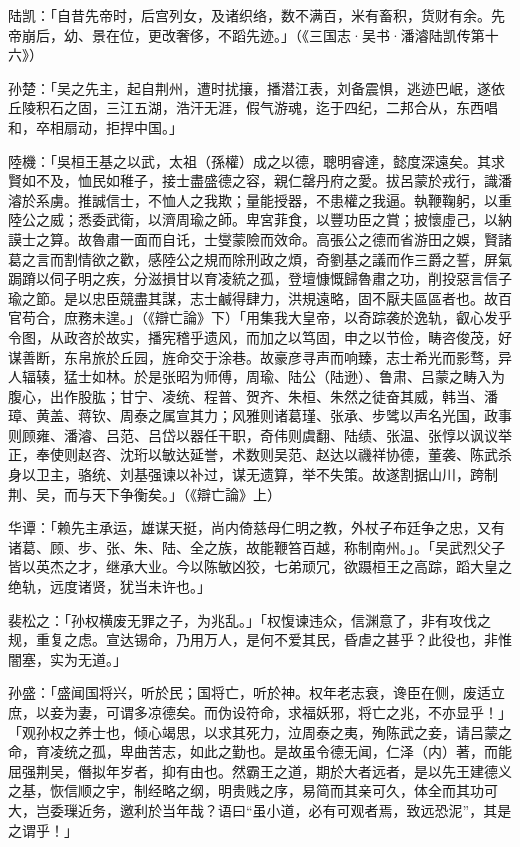 陆凯：「自昔先帝时，后宫列女，及诸织络，数不满百，米有畜积，货财有余。先帝崩后，幼、景在位，更改奢侈，不蹈先迹。」（《三国志·吴书·潘濬陆凯传第十六》）

孙楚：「吴之先主，起自荆州，遭时扰攘，播潜江表，刘备震惧，逃迹巴岷，遂依丘陵积石之固，三江五湖，浩汗无涯，假气游魂，迄于四纪，二邦合从，东西唱和，卒相扇动，拒捍中国。」

陸機：「吳桓王基之以武，太祖（孫權）成之以德，聰明睿達，懿度深遠矣。其求賢如不及，恤民如稚子，接士盡盛德之容，親仁罄丹府之愛。拔呂蒙於戎行，識潘濬於系虜。推誠信士，不恤人之我欺；量能授器，不患權之我逼。執鞭鞠躬，以重陸公之威；悉委武衛，以濟周瑜之師。卑宮菲食，以豐功臣之賞；披懷虛己，以納謨士之算。故魯肅一面而自讬，士燮蒙險而效命。高張公之德而省游田之娛，賢諸葛之言而割情欲之歡，感陸公之規而除刑政之煩，奇劉基之議而作三爵之誓，屏氣跼蹐以伺子明之疾，分滋損甘以育凌統之孤，登壇慷慨歸魯肅之功，削投惡言信子瑜之節。是以忠臣競盡其謀，志士鹹得肆力，洪規遠略，固不厭夫區區者也。故百官苟合，庶務未遑。」（《辯亡論》下）「用集我大皇帝，以奇踪袭於逸轨，叡心发乎令图，从政咨於故实，播宪稽乎遗风，而加之以笃固，申之以节俭，畴咨俊茂，好谋善断，东帛旅於丘园，旌命交于涂巷。故豪彦寻声而响臻，志士希光而影骛，异人辐辏，猛士如林。於是张昭为师傅，周瑜、陆公（陆逊）、鲁肃、吕蒙之畴入为腹心，出作股肱；甘宁、凌统、程普、贺齐、朱桓、朱然之徒奋其威，韩当、潘璋、黄盖、蒋钦、周泰之属宣其力；风雅则诸葛瑾、张承、步骘以声名光国，政事则顾雍、潘濬、吕范、吕岱以器任干职，奇伟则虞翻、陆绩、张温、张惇以讽议举正，奉使则赵咨、沈珩以敏达延誉，术数则吴范、赵达以禨祥协德，董袭、陈武杀身以卫主，骆统、刘基强谏以补过，谋无遗算，举不失策。故遂割据山川，跨制荆、吴，而与天下争衡矣。」（《辯亡論》上）

华谭：「赖先主承运，雄谋天挺，尚内倚慈母仁明之教，外杖子布廷争之忠，又有诸葛、顾、步、张、朱、陆、全之族，故能鞭笞百越，称制南州。」。「吴武烈父子皆以英杰之才，继承大业。今以陈敏凶狡，七弟顽冗，欲蹑桓王之高踪，蹈大皇之绝轨，远度诸贤，犹当未许也。」

裴松之：「孙权横废无罪之子，为兆乱。」「权愎谏违众，信渊意了，非有攻伐之规，重复之虑。宣达锡命，乃用万人，是何不爱其民，昏虐之甚乎？此役也，非惟闇塞，实为无道。」

孙盛：「盛闻国将兴，听於民；国将亡，听於神。权年老志衰，谗臣在侧，废适立庶，以妾为妻，可谓多凉德矣。而伪设符命，求福妖邪，将亡之兆，不亦显乎！」「观孙权之养士也，倾心竭思，以求其死力，泣周泰之夷，殉陈武之妾，请吕蒙之命，育凌统之孤，卑曲苦志，如此之勤也。是故虽令德无闻，仁泽（内）著，而能屈强荆吴，僭拟年岁者，抑有由也。然霸王之道，期於大者远者，是以先王建德义之基，恢信顺之宇，制经略之纲，明贵贱之序，易简而其亲可久，体全而其功可大，岂委璅近务，邀利於当年哉？语曰“虽小道，必有可观者焉，致远恐泥”，其是之谓乎！」

